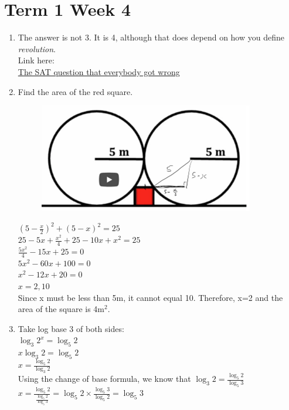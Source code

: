 \documentclass[../main.tex]{subfiles}
\begin{document}
\section*{Term 1 Week 4}
\begin{enumerate}
    \item 
    The answer is not 3. It is 4, although that does depend on how you define \textit{revolution}.\\

    Link here:\\
    \href{https://www.youtube.com/watch?v=FUHkTs-Ipfg&ab_channel=Veritasium}{The SAT question that everybody got wrong}

    \item 
    Find the area of the red square.\\
    \begin{figure}[H]
        \centering
        \includegraphics{images/t1w4q2_a.png}
    \end{figure}

    \((5-\frac{x}{2})^2+(5-x)^2=25\)\\

    \(25-5x+\frac{x^2}{4}+25-10x+x^2=25\)\\

    \(\frac{5x^2}{4}-15x+25=0\)\\

    \(5x^2-60x+100=0\)\\

    \(x^2-12x+20=0\)\\

    \(x=2,10\)\\

    Since x must be less than 5m, it cannot equal 10. Therefore, x=2 and the area of the square is 4m\(^2\).\\
    
    \item 
    Take log base 3 of both sides:\\
    \(\log_3 2^x=\log_5 2\)\\

    \(x \log_3 2=\log_5 2\)\\

    \(x=\frac{\log_5 2}{\log_3 2}\)\\

    Using the change of base formula, we know that \(\log_3 2=\frac{\log_5 2}{\log_5 3}\)\\

    \(x=\frac{\log_5 2}{\frac{\log_5 2}{\log_5 3}}=\log_5 2 \times \frac{\log_5 3}{\log_5 2}=\log_5 3\)
\end{enumerate}
\end{document}
